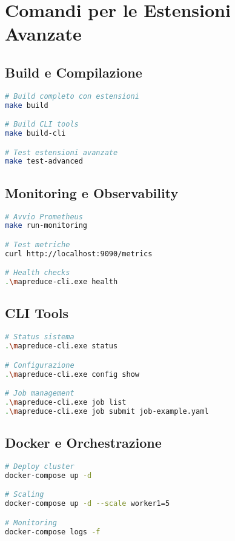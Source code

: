\documentclass[12pt,a4paper]{article}
\begin{document}
\section{Comandi per le Estensioni Avanzate}

\subsection{Build e Compilazione}

\begin{lstlisting}[language=bash]
# Build completo con estensioni
make build

# Build CLI tools
make build-cli

# Test estensioni avanzate
make test-advanced
\end{lstlisting}

\subsection{Monitoring e Observability}

\begin{lstlisting}[language=bash]
# Avvio Prometheus
make run-monitoring

# Test metriche
curl http://localhost:9090/metrics

# Health checks
.\mapreduce-cli.exe health
\end{lstlisting}

\subsection{CLI Tools}

\begin{lstlisting}[language=bash]
# Status sistema
.\mapreduce-cli.exe status

# Configurazione
.\mapreduce-cli.exe config show

# Job management
.\mapreduce-cli.exe job list
.\mapreduce-cli.exe job submit job-example.yaml
\end{lstlisting}

\subsection{Docker e Orchestrazione}

\begin{lstlisting}[language=bash]
# Deploy cluster
docker-compose up -d

# Scaling
docker-compose up -d --scale worker1=5

# Monitoring
docker-compose logs -f
\end{lstlisting}
\end{document}

